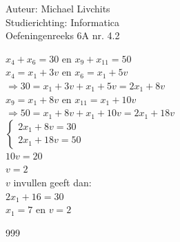 \documentclass[a4paper]{article}
\begin{document}
  
\noindent \large Auteur: Michael Livchits \\
\noindent \large Studierichting: Informatica\\
\noindent \large Oefeningenreeks 6A nr. 4.2\\

\medskip

\normalsize

$x_4 + x_6 = 30$ en $x_9 + x_{11} = 50$\\

$x_4 = x_1 + 3v$ en $x_6 = x_1 + 5v$\\

$\Rightarrow 30 = x_1 + 3v + x_1 + 5v = 2x_1 + 8v$\\

$x_9 = x_1 + 8v$ en $x_{11} = x_1 + 10v$\\

$\Rightarrow 50 = x_1 + 8v + x_1 + 10v = 2x_1 + 18v$\\

$\left\{
	\begin{array}{l}
		2x_1 + 8v = 30 \\
		2x_1 + 18v = 50
	\end{array}
\right .$\\

$10v = 20$\\

$v = 2$\\

$v$ invullen geeft dan:\\

$2x_1 + 16 = 30$\\

$x_1 = 7$ en $v = 2$\\

\begin{thebibliography}{999}
\end{thebibliography}
\end{document}
